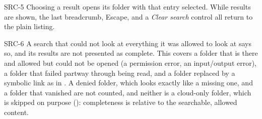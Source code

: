 \begin{req}{SRC-5}
Choosing a result opens its folder with that entry selected.  While results are
shown, the last breadcrumb, Escape, and a \emph{Clear search} control all return to
the plain listing.
\end{req}

\begin{req}{SRC-6}
A search that could not look at everything it was allowed to look at says so, and its
results are not presented as complete.  This covers a folder that is there and
allowed but could not be opened (a permission error, an input/output error), a
folder that failed partway through being read, and a folder replaced by a symbolic
link as in .  A denied folder, which looks exactly like a missing one,
and a folder that vanished are not counted, and neither is a cloud-only folder, which
is skipped on purpose (): completeness is relative to the searchable,
allowed content.
\end{req}
